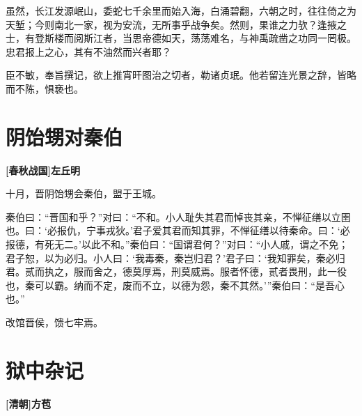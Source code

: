 \documentclass[UTF8,titlepage,oneside]{ctexbook}
\begin{document}
虽然，长江发源岷山，委蛇七千余里而始入海，白涌碧翻，六朝之时，往往倚之为天堑；今则南北一家，视为安流，无所事乎战争矣。然则，果谁之力欤？逢掖之士，有登斯楼而阅斯江者，当思帝德如天，荡荡难名，与神禹疏凿之功同一罔极。忠君报上之心，其有不油然而兴者耶？


臣不敏，奉旨撰记，欲上推宵旰图治之切者，勒诸贞珉。他若留连光景之辞，皆略而不陈，惧亵也。



\chapter*{阴饴甥对秦伯}
\begin{center}
	\textbf{[春秋战国]左丘明}
\end{center}


十月，晋阴饴甥会秦伯，盟于王城。


秦伯曰：“晋国和乎？”对曰：“不和。小人耻失其君而悼丧其亲，不惮征缮以立圉也。曰：‘必报仇，宁事戎狄。’君子爱其君而知其罪，不惮征缮以待秦命。曰：‘必报德，有死无二。’以此不和。”秦伯曰：“国谓君何？”对曰：“小人戚，谓之不免；君子恕，以为必归。小人曰：‘我毒秦，秦岂归君？’君子曰：‘我知罪矣，秦必归君。贰而执之，服而舍之，德莫厚焉，刑莫威焉。服者怀德，贰者畏刑，此一役也，秦可以霸。纳而不定，废而不立，以德为怨，秦不其然。’”秦伯曰：“是吾心也。”


改馆晋侯，馈七牢焉。



\chapter*{狱中杂记}
\begin{center}
	\textbf{[清朝]方苞}
\end{center}
\end{document}
